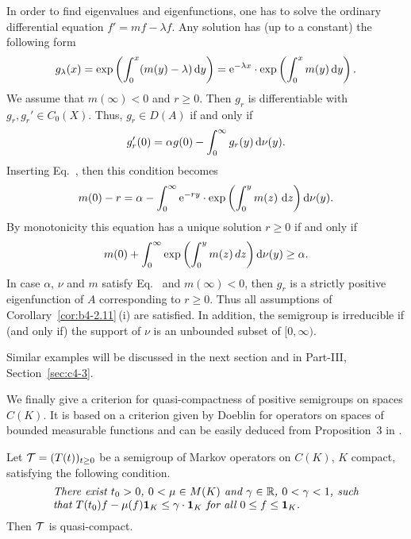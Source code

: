 \begin{example}
In order to find eigenvalues and eigenfunctions, one has to solve the ordinary differential equation $f' = mf - \lambda f$. 
Any solution has (up to a constant) the following form
\begin{equation}\label{eq:b4-2.9}
	g_{\lambda}(x) = \exp\left(\int_0^x(m(y) - \lambda)\mathop{}\!\mathrm{d}{y} \right) = \mathrm{e}^{-\lambda x} \cdot \exp\left(\int_0^x m(y) \mathop{}\!\mathrm{d}{y} \right) .
\end{equation}
We assume that $m(\infty) < 0$ and $r \geq 0$. 
Then $g_r$ is differentiable with $g_r, g_r' \in C_{0}(X)$. 
Thus, $g_r \in D(A)$ if and only if\/ 
%
\[
	g_r'(0) = \alpha g(0) - \int_0^{\infty} g_r(y) \mathop{}\!\mathrm{d}{\nu}(y) .
\]
%
Inserting Eq.~, then this condition becomes
\[
m(0) - r = \alpha - \int_0^{\infty} \mathrm{e}^{-ry} \cdot \exp\left(\int_{0}^{y}  m(z) \,\mathop{}\!\mathrm{d}{z}\right)\mathop{}\!\mathrm{d}{\nu}(y) .
\]
By monotonicity this equation has a unique solution $r \geq 0$ if and only if
\begin{equation}\label{eq:b4-2.10}
	m(0) + \int_0^{\infty} \exp\left(\int_0^y m(z) \, dz\right)\diff{\nu}(y) \geq \alpha .
\end{equation}
In case $\alpha$, $\nu$ and $m$ satisfy Eq.~ and $m(\infty) < 0$, then $g_r$ is a strictly positive eigenfunction of\/ $A$ corresponding to $r \geq 0$. 
Thus all assumptions of Corollary~\ref{cor:b4-2.11}\,(i) are satisfied. 
In addition, the semigroup is irreducible if (and only if) the support of\/ $\nu$ is an unbounded subset of\/ $[0,\infty)$.
\end{example}
Similar examples will be discussed in the next section and in  Part-III, Section~\ref{sec:c4-3}.

We finally give a criterion for quasi-compactness of positive semigroups on spaces $C(K)$. 
It is based on a criterion given by Doeblin for operators on spaces of bounded measurable functions and can be easily deduced from  Proposition~3 in \textcite{lotz:1981}.
\begin{proposition}\label{prop:b4-2.13}
%
%
	Let $\TT = (T(t))_{t \geq 0}$ be a semigroup of Markov operators on $C(K)$, $K$ compact, satisfying the following condition.
\begin{equation*}\label{eq:b4-2.12}	
\begin{minipage}{.8\textwidth}
%	
\textit{There exist $t_{0} > 0$, $ 0 < \mu \in M(K)$ and  $\gamma \in \R$, $0 < \gamma < 1 $, 
such that  $T(t_{0})f - \mu(f)\1_K \leq \gamma \cdot \1_K$  for all   $0 \leq f \leq \1_K$.}
%
\end{minipage}
\end{equation*}
Then $\mathcal{T}$ is quasi-compact.
\end{proposition}

